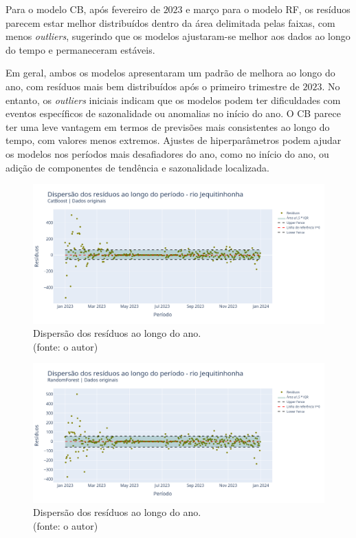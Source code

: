Para o modelo CB, após fevereiro de $2023$ e março para o modelo RF, os resíduos parecem estar melhor distribuídos dentro da área delimitada pelas faixas, com menos \textit{outliers}, sugerindo que os modelos ajustaram-se melhor aos dados ao longo do tempo e permaneceram estáveis.

Em geral, ambos os modelos apresentaram um padrão de melhora ao longo do ano, com resíduos mais bem distribuídos após o primeiro trimestre de $2023$. No entanto, os \textit{outliers} iniciais indicam que os modelos podem ter dificuldades com eventos específicos de sazonalidade ou anomalias no início do ano. O CB parece ter uma leve vantagem em termos de previsões mais consistentes ao longo do tempo, com valores menos extremos. Ajustes de hiperparâmetros podem ajudar os modelos nos períodos mais desafiadores do ano, como no início do ano, ou adição de componentes de tendência e sazonalidade localizada.

\begin{figure}[!h]
	\centering
	\includegraphics[scale=0.33]{Figuras/jequiti/wfv/CB/CB_WFV_ORIG_RESID_x_TEMPO.png}
	\caption{Dispersão dos resíduos ao longo do ano.\\(fonte: o autor)}
	\label{fig:jequiti_CB_WFV_ORIG_RESID_x_TEMPO}
\end{figure}

\begin{figure}[!h]
	\centering
	\includegraphics[scale=0.33]{Figuras/jequiti/wfv/RF/RF_WFV_ORIG_RESID_x_TEMPO.png}
	\caption{Dispersão dos resíduos ao longo do ano.\\(fonte: o autor)}
	\label{fig:jequiti_RF_WFV_ORIG_RESID_x_TEMPO}
\end{figure}
\clearpage


